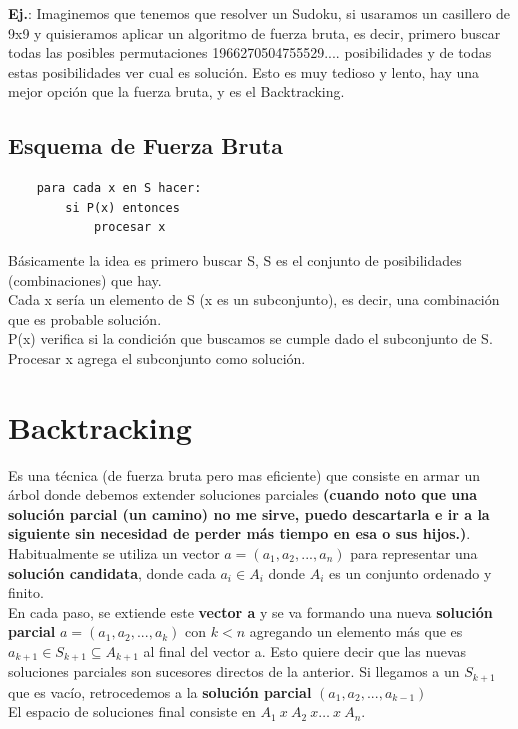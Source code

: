 \documentclass[10pt,a4paper]{article}
\begin{document}
\textbf{Ej.}: Imaginemos que tenemos que resolver un Sudoku, si usaramos un casillero de 9x9 y quisieramos aplicar un algoritmo de fuerza bruta, es decir, primero buscar todas las posibles permutaciones 1966270504755529.... posibilidades y de todas estas posibilidades ver cual es solución. Esto es muy tedioso y lento, hay una mejor opción que la fuerza bruta, y es el Backtracking.
\subsection*{Esquema de Fuerza Bruta}
\begin{lstlisting}
    para cada x en S hacer:
        si P(x) entonces
            procesar x
\end{lstlisting}
Básicamente la idea es primero buscar S, S es el conjunto de posibilidades (combinaciones) que hay. \\
Cada x sería un elemento de S (x es un subconjunto), es decir, una combinación que es probable solución. \\
P(x) verifica si la condición que buscamos se cumple dado el subconjunto de S.  \\
Procesar x agrega el subconjunto como solución.
\section*{Backtracking}
Es una técnica (de fuerza bruta pero mas eficiente) que consiste en armar un árbol donde debemos extender soluciones parciales \textbf{(cuando noto que una solución parcial (un camino) no me sirve, puedo descartarla e ir a la siguiente sin necesidad de perder más tiempo en esa o sus hijos.)}. \\

Habitualmente se utiliza un vector $ a = (a_{1}, a_{2}, ..., a_{n})$ para representar una \textbf{solución candidata}, donde cada $a_{i} \in A_{i}$ donde $A_{i}$ es un conjunto ordenado y finito. \\ 
En cada paso, se extiende este \textbf{vector a} y se va formando una nueva \textbf{solución parcial} $a = (a_{1}, a_{2}, ..., a_{k})$ con $k<n$  agregando un elemento más que es $a_{k+1} \in S_{k+1} \subseteq A_{k+1}$ al final del vector a. Esto quiere decir que las nuevas soluciones parciales son sucesores directos de la anterior. Si llegamos a un $S_{k+1}$ que es vacío, retrocedemos a la \textbf{solución parcial }$(a_{1}, a_{2}, ..., a_{k-1})$ \\

El espacio de soluciones final consiste en $ A_{1} \ x \ A_{2} \ x \dots \ x \ A_{n} $. \\
\end{document}
